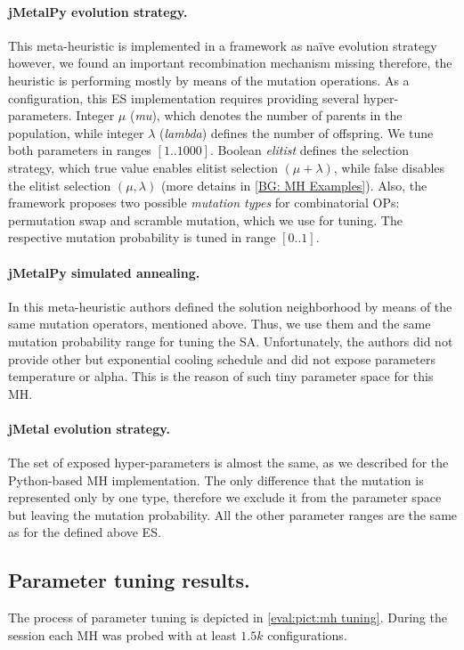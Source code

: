 \paragraph{jMetalPy evolution strategy.} This meta-heuristic is implemented in a framework as na\"ive evolution strategy however, we found an important recombination mechanism missing therefore, the heuristic is performing mostly by means of the mutation operations. As a configuration, this ES implementation requires providing several hyper-parameters. Integer $\mu$ (\emph{mu}), which denotes the number of parents in the population, while integer $\lambda$ (\emph{lambda}) defines the number of offspring. We tune both parameters in ranges $[1..1000]$. Boolean \emph{elitist} defines the selection strategy, which true value enables elitist selection $(\mu+\lambda)$, while false disables the elitist selection $(\mu,\lambda)$ (more detains in \cref{BG: MH Examples}). Also, the framework proposes two possible \emph{mutation types} for combinatorial OPs: permutation swap and scramble mutation, which we use for tuning. The respective mutation probability is tuned in range $[0..1]$.

\paragraph{jMetalPy simulated annealing.} In this meta-heuristic authors defined the solution neighborhood by means of the same mutation operators, mentioned above. Thus, we use them and the same mutation probability range for tuning the SA. Unfortunately, the authors did not provide other but exponential cooling schedule and did not expose parameters temperature or alpha. This is the reason of such tiny parameter space for this MH.

\paragraph{jMetal evolution strategy.} The set of exposed hyper-parameters is almost the same, as we described for the Python-based MH implementation. The only difference that the mutation is represented only by one type, therefore we exclude it from the parameter space but leaving the mutation probability. All the other parameter ranges are the same as for the defined above ES.


\subsection{Parameter tuning results.} 
The process of parameter tuning is depicted in \cref{eval:pict:mh tuning}. During the session each MH was probed with at least $1.5k$ configurations. 



